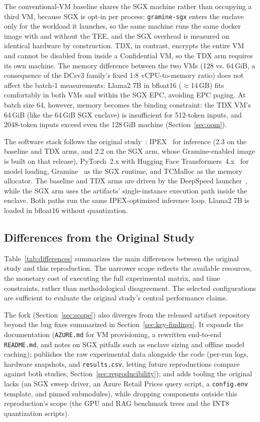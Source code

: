 \documentclass[sigconf]{acmart}
\begin{document}
The conventional-VM baseline shares the SGX machine rather than occupying a third VM,
because SGX is opt-in per process: \texttt{gramine-sgx} enters the enclave only for the
workload it launches, so the same machine runs the same docker image with and without
the TEE, and the SGX overhead is measured on identical hardware by construction. TDX,
in contrast, encrypts the entire VM and cannot be disabled from inside a Confidential
VM, so the TDX arm requires its own machine. The memory difference between the two VMs
(128 vs. 64\,GiB, a consequence of the DCsv3 family's fixed 1:8 vCPU-to-memory ratio)
does not affect the batch-1 measurements: Llama2 7B in bfloat16 ($\approx$14\,GB) fits
comfortably in both VMs and within the SGX EPC, avoiding EPC paging. At batch size 64,
however, memory becomes the binding constraint: the TDX VM's 64\,GiB (like the
64\,GiB SGX enclave) is insufficient for 512-token inputs, and 2048-token inputs
exceed even the 128\,GiB machine (Section~\ref{sec:oom}).

The software stack follows the original study~\cite{chrapek2025confidential}:
IPEX~\cite{ipex} for inference (2.3 on the baseline and TDX arms, and 2.2 on the SGX
arm, whose Gramine-enabled image is built on that release), PyTorch~2.x with Hugging
Face Transformers~4.x~\cite{transformers} for model loading, Gramine~\cite{gramine} as
the SGX runtime, and
TCMalloc as the memory allocator. The baseline and TDX arms are driven by the DeepSpeed
launcher~\cite{deepspeed}, while the SGX arm uses the artifacts' single-instance
execution path inside
the enclave. Both paths run the same IPEX-optimized inference loop. Llama2 7B is loaded
in bfloat16 without quantization.

\subsection{Differences from the Original Study}

Table~\ref{tab:differences} summarizes the main differences between the original study
and this reproduction. The narrower scope reflects the available resources, the monetary
cost of executing the full experimental matrix, and time constraints, rather than
methodological disagreement. The selected configurations are sufficient to evaluate the
original study's central performance claims.

The fork (Section~\ref{sec:scope}) also diverges from the released artifact repository
beyond the bug fixes summarized in Section~\ref{sec:key-findings}. It expands the
documentation (\texttt{AZURE.md} for VM provisioning, a rewritten end-to-end
\texttt{README.md}, and notes on SGX pitfalls such as enclave sizing and offline model
caching); publishes the raw experimental data alongside the code (per-run logs,
hardware snapshots, and \texttt{results.csv}, letting future reproductions compare
against both studies, Section~\ref{sec:reproducibility}); and adds tooling the
original lacks (an SGX sweep driver, an Azure Retail Prices query script, a
\texttt{config.env} template, and pinned submodules), while dropping components
outside this reproduction's scope (the GPU and RAG benchmark trees and the INT8
quantization scripts).
\end{document}

